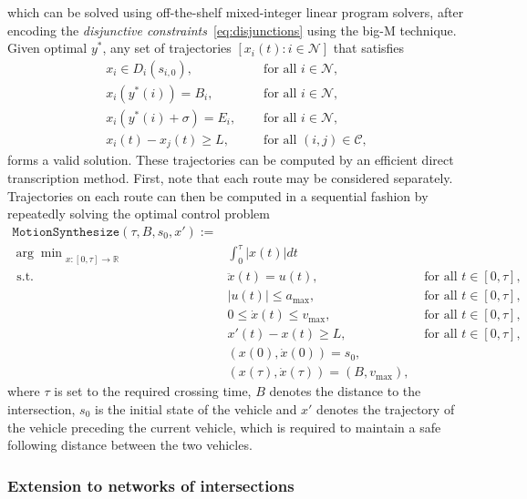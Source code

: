 \documentclass{article}
\theoremstyle{definition}
\theoremstyle{plain}
\begin{document}
which can be solved using off-the-shelf mixed-integer linear program solvers,
after encoding the \textit{disjunctive constraints}~\eqref{eq:disjunctions} using the big-M
technique. Given optimal $y^{*}$, any set of trajectories
$[x_{i}(t) : i \in \mathcal{N}]$ that satisfies
\begin{align*}
  x_{i} \in D_{i}(s_{i,0}) , \quad & \text{ for all } i \in \mathcal{N} , \\
  x_{i}(y^{*}(i)) = B_{i} , \quad & \text{ for all } i \in \mathcal{N} , \\
  x_{i}(y^{*}(i) + \sigma) = E_{i} , \quad & \text{ for all } i \in \mathcal{N} , \\
  x_{i}(t) - x_{j}(t) \geq L , \quad & \text{ for all } (i,j) \in \mathcal{C} ,
\end{align*}
forms a valid solution. These trajectories can be computed by an efficient
direct transcription method. First, note that each route may be considered
separately. Trajectories on each route can then be computed in a sequential
fashion by repeatedly solving the optimal control problem
%
\begin{align*}
\texttt{MotionSynthesize}(\tau, B, s_{0}, x') := \\
  {\arg\min}_{x: [0, \tau] \rightarrow \mathbb{R}} & \int_{0}^{\tau} |x(t)| dt \\
  \text{ s.t. } & \ddot{x}(t) = u(t) , &  \text{ for all } t \in [0, \tau] , \\
  & |u(t)| \leq a_{\max} , &  \text{ for all } t \in [0, \tau] , \\
  & 0 \leq \dot{x}(t) \leq v_{\max} , &  \text{ for all } t \in [0, \tau] , \\
  & x'(t) - x(t) \geq L , &  \text{ for all } t \in [0, \tau] , \\
  & (x(0), \dot{x}(0)) = s_{0} , \\
  & (x(\tau), \dot{x}(\tau)) = (B, v_{\max}) ,
\end{align*}
where $\tau$ is set to the required crossing time, $B$ denotes the distance to the
intersection, $s_{0}$ is the initial state of the vehicle and $x'$ denotes the
trajectory of the vehicle preceding the current vehicle, which is required to
maintain a safe following distance between the two vehicles.

\subsubsection{Extension to networks of intersections}
\end{document}
